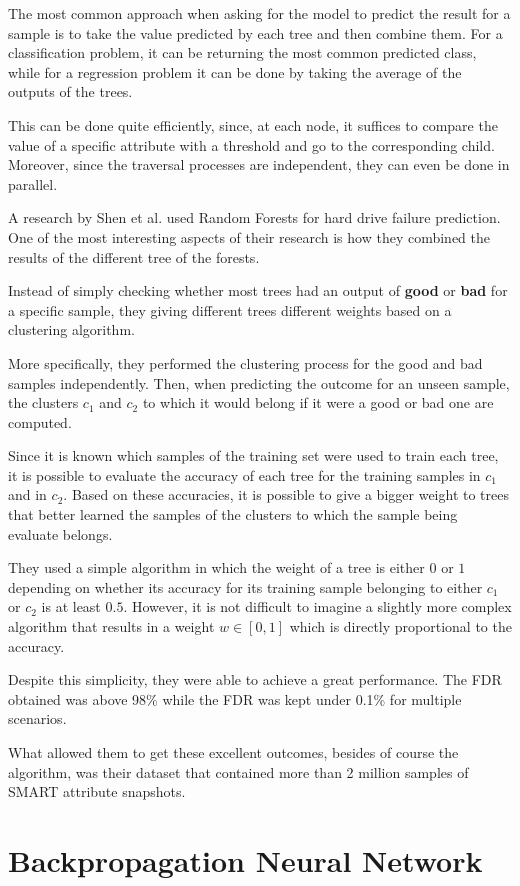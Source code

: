 The most common approach when asking for the model to predict the result for a sample is to take the value predicted by each tree and then combine them.
For a classification problem, it can be returning the most common predicted class, while for a regression problem it can be done by taking the average of the outputs of the trees.

This can be done quite efficiently, since, at each node, it suffices to compare the value of a specific attribute with a threshold and go to the corresponding child.
Moreover, since the traversal processes are independent, they can even be done in parallel.

A research by Shen et al. \cite{Shen18} used Random Forests for hard drive failure prediction.
One of the most interesting aspects of their research is how they combined the results of the different tree of the forests.

Instead of simply checking whether most trees had an output of \textbf{good} or \textbf{bad} for a specific sample, they giving different trees different weights based on a clustering algorithm.

More specifically, they performed the clustering process for the good and bad samples independently.
Then, when predicting the outcome for an unseen sample, the clusters $c_1$ and $c_2$ to which it would belong if it were a good or bad one are computed.

Since it is known which samples of the training set were used to train each tree, it is possible to evaluate the accuracy of each tree for the training samples in $c_1$ and in $c_2$.
Based on these accuracies, it is possible to give a bigger weight to trees that better learned the samples of the clusters to which the sample being evaluate belongs.

They used a simple algorithm in which the weight of a tree is either $0$ or $1$ depending on whether its accuracy for its training sample belonging to either $c_1$ or $c_2$ is at least $0.5$.
However, it is not difficult to imagine a slightly more complex algorithm that results in a weight $w \in \left[0,1\right]$ which is directly proportional to the accuracy.

Despite this simplicity, they were able to achieve a great performance.
The FDR obtained was above 98\% while the FDR was kept under 0.1\% for multiple scenarios.

What allowed them to get these excellent outcomes, besides of course the algorithm, was their dataset that contained more than 2 million samples of SMART attribute snapshots.

\section{Backpropagation Neural Network}\label{sec:BackpropagationNeuralNetwork}